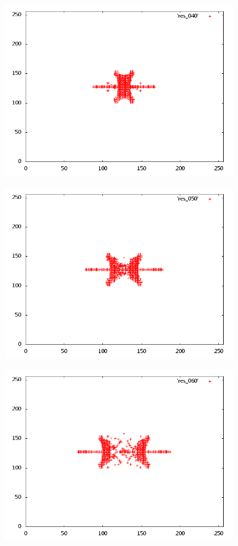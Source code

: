 \begin{center}
\includegraphics[width=4in]{res_040.png}
\end{center}
\begin{center}
\includegraphics[width=4in]{res_050.png}
\end{center}
\begin{center}
\includegraphics[width=4in]{res_060.png}
\end{center}
